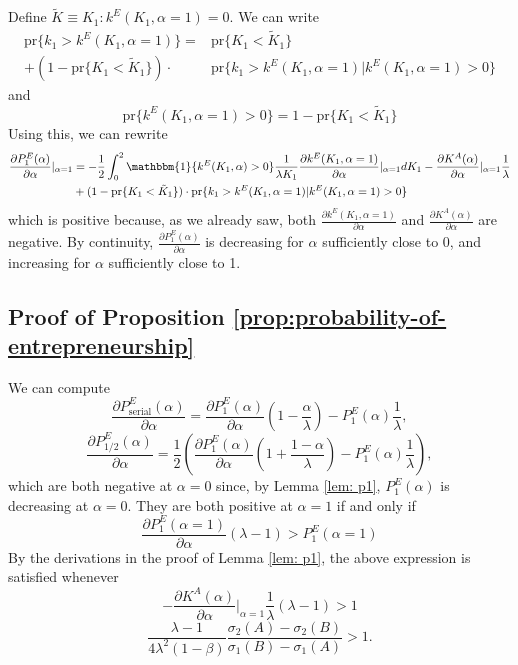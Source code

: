 \documentclass[12pt,american]{paper}
\theoremstyle{remark}
\begin{document}
Define $\tilde K \equiv K_1: k^E(K_1,\alpha=1)=0 $. We can write
\begin{align*}
\mbox{pr}\{k_1>k^E(K_1,\alpha=1) \} = & \mbox{pr}\{K_1<\tilde K_1\} \\ +  (1-  \mbox{pr}\{K_1<\tilde K_1\}) \cdot & \mbox{pr}\{k_1>k^E(K_1,\alpha=1)| k^E(K_1,\alpha=1)>0 \} 
\end{align*}
and
\[
\mbox{pr}\{k^E(K_1,\alpha=1) > 0\} =1-\mbox{pr}\{K_1<\tilde K_1\}
\]
Using this, we can rewrite 
\begin{align*}
\frac{\partial P^E_1(\alpha)}{\partial \alpha}|_{\alpha=1} & = - \frac{1}{2} \int_0^2  \mathbbm{1}\{ k^E(K_1,\alpha)>0\} \frac{1}{\lambda K_1} \frac{\partial k^E(K_1,\alpha=1)}{\partial \alpha}|_{\alpha=1} dK_1 -\frac{\partial K^A(\alpha)}{\partial \alpha}|_{\alpha=1}  \frac{1}{\lambda}  \\ & + (1-  \mbox{pr}\{K_1<\tilde K_1\}) \cdot \mbox{pr}\{k_1>k^E(K_1,\alpha=1)| k^E(K_1,\alpha=1)>0 \}
\end{align*}
which is positive because, as we already saw, both $\frac{\partial k^E(K_1,\alpha=1)}{\partial \alpha}$ and $\frac{\partial K^A(\alpha)}{\partial \alpha}$ are negative. By continuity, $\frac{\partial P^E_1(\alpha)}{\partial \alpha}$ is decreasing for $\alpha$ sufficiently close to $0$, and increasing for $\alpha$ sufficiently close to 1. 





\subsection*{Proof of Proposition \ref{prop:probability-of-entrepreneurship}}

We can compute
$$
\frac{\partial P_{\mbox{serial}}^E(\alpha)}{\partial \alpha}= \frac{\partial P^E_1(\alpha)}{\partial \alpha} \left(1-\frac{\alpha}{\lambda} \right) - P_1^E(\alpha) \frac{1}{\lambda},
$$
$$
\frac{\partial P_{1/2}^E(\alpha)}{\partial \alpha}= \frac{1}{2} \left( \frac{\partial P^E_1(\alpha)}{\partial \alpha} \left(1+\frac{1-\alpha}{\lambda} \right) - P_1^E(\alpha) \frac{1}{\lambda} \right),
$$
which are both negative at $\alpha=0$ since, by Lemma \ref{lem: p1}, $P^E_1(\alpha)$ is decreasing at $\alpha=0$. They are both positive at $\alpha=1$ if and only if 
$$\frac{\partial P^E_1(\alpha=1)}{\partial \alpha}  (\lambda -1) >P_1^E(\alpha=1) $$
By the derivations in the proof of Lemma \ref{lem: p1}, the above expression is satisfied whenever
$$-\frac{\partial K^A(\alpha)}{\partial \alpha}|_{\alpha=1}  \frac{1}{\lambda}  (\lambda -1) >1 $$
$$
\frac{\lambda -1}{4 \lambda^2 (1-\beta)} \frac{ \sigma_2(A)- \sigma_2(B)}{ \sigma_1(B)- \sigma_1(A)}>1.
$$
\end{document}
